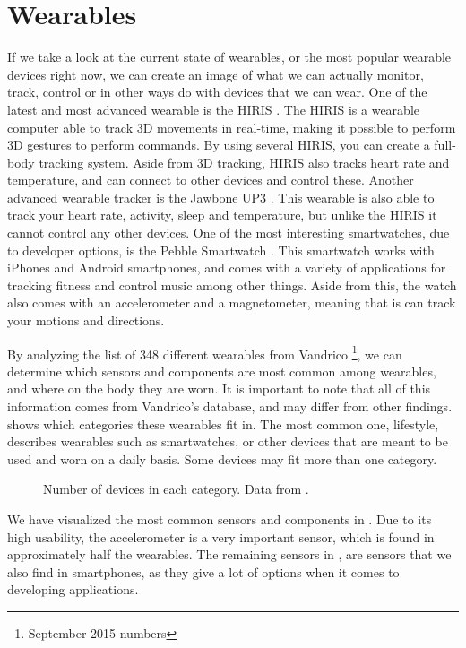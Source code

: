 \section{Wearables}\label{sec:wearables}
If we take a look at the current state of wearables, 
or the most popular wearable devices right now, 
we can create an image of what we can actually monitor, track, 
control or in other ways do with devices that we can wear. 
One of the latest and most advanced wearable is the HIRIS \cite{hirisweb}. 
The HIRIS is a wearable computer able to track 3D movements in real-time, 
making it possible to perform 3D gestures to \eg perform commands. 
By using several HIRIS, you can create a full-body tracking system.
Aside from 3D tracking, HIRIS also tracks heart rate and temperature, 
and can connect to other devices and control these. 
Another advanced wearable tracker is the Jawbone UP3 \cite{JAWBONE}. 
This wearable is also able to track your heart rate, activity, sleep and temperature, 
but unlike the HIRIS it cannot control any other devices. 
One of the most interesting smartwatches, due to developer options, is the Pebble Smartwatch \cite{PEBBLE}. 
This smartwatch works with iPhones and Android smartphones, 
and comes with a variety of applications for tracking fitness and control music among other things. 
Aside from this, the watch also comes with an accelerometer and a magnetometer, 
meaning that is can track your motions and directions. 

By analyzing the list of 348 different wearables from Vandrico \cite{LISTOFWEARABLES}\footnote{September 2015 numbers}, 
we can determine which sensors and components are most common among wearables, 
and where on the body they are worn. 
It is important to note that all of this information comes from Vandrico's database, 
and may differ from other findings. 
 shows which categories these wearables fit in. 
The most common one, lifestyle, describes wearables such as smartwatches, 
or other devices that are meant to be used and worn on a daily basis. 
Some devices may fit more than one category.

\begin{figure}[!htb]
    \centering
    
    \caption{Number of devices in each category. Data from \protect\cite{LISTOFWEARABLES}.}
    \label{fig:wearables-category}
\end{figure}

We have visualized the most common sensors and components in .
Due to its high usability, the accelerometer is a very important sensor, 
which is found in approximately half the wearables. 
The remaining sensors in , 
are sensors that we also find in smartphones, 
as they give a lot of options when it comes to developing applications. 

